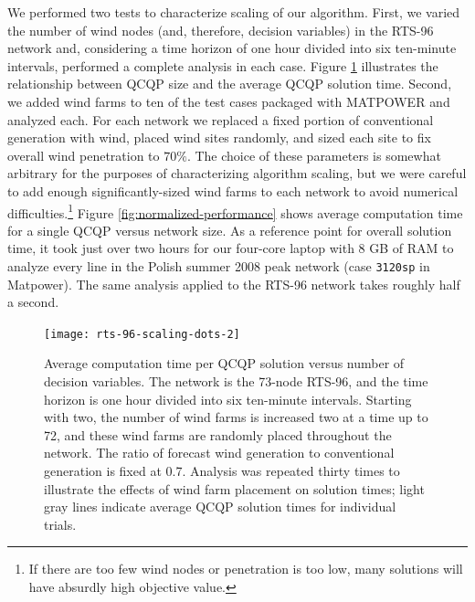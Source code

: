 \documentclass[journal,twoside]{IEEEtran}
\begin{document}
We performed two tests to characterize scaling of our algorithm. First, we varied the number of wind nodes (and, therefore, decision variables) in the RTS-96 network and, considering a time horizon of one hour divided into six ten-minute intervals, performed a complete analysis in each case. Figure \ref{fig:rts-96-scaling} illustrates the relationship between QCQP size and the average QCQP solution time. Second, we added wind farms to ten of the test cases packaged with MATPOWER \cite{zimmerman2011} and analyzed each. For each network we replaced a fixed portion of conventional generation with wind, placed wind sites randomly, and sized each site to fix overall wind penetration to $70\%$. The choice of these parameters is somewhat arbitrary for the purposes of characterizing algorithm scaling, but we were careful to add enough significantly-sized wind farms to each network to avoid numerical difficulties.\footnote{If there are too few wind nodes or penetration is too low, many solutions will have absurdly high objective value.} Figure \ref{fig:normalized-performance} shows average computation time for a single QCQP versus network size. As a reference point for overall solution time, it took just over two hours for our four-core laptop with 8 GB of RAM to analyze every line in the Polish summer 2008 peak network (case \texttt{3120sp} in Matpower). The same analysis applied to the RTS-96 network takes roughly half a second.


\begin{figure}[!t]
\centering
\texttt{[image: rts-96-scaling-dots-2]}
\caption{Average computation time per QCQP solution versus number of decision variables. The network is the 73-node RTS-96, and the time horizon is one hour divided into six ten-minute intervals. Starting with two, the number of wind farms is increased two at a time up to 72, and these wind farms are randomly placed throughout the network. The ratio of forecast wind generation to conventional generation is fixed at 0.7. Analysis was repeated thirty times to illustrate the effects of wind farm placement on solution times; light gray lines indicate average QCQP solution times for individual trials.}
\label{fig:rts-96-scaling}
\end{figure}
\end{document}
